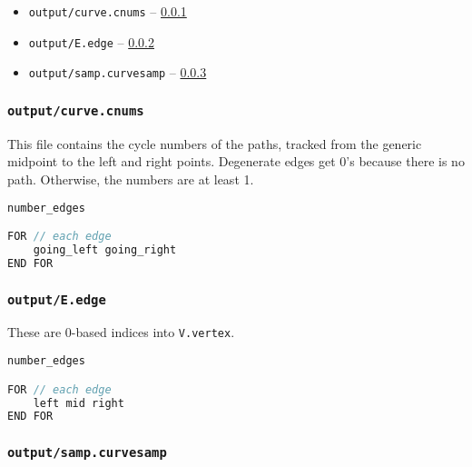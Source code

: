 \begin{itemize}
	\item {\tt output/curve.cnums} -- \ref{sec:curve.cnums}
	\item {\tt output/E.edge} -- \ref{sec:e.edge}
	\item {\tt output/samp.curvesamp} -- \ref{sec:samp.curvesamp}
\end{itemize}


\subsubsection{\tt output/curve.cnums}
\label{sec:curve.cnums}


This file contains the cycle numbers of the paths, tracked from the generic midpoint to the left and right points.  Degenerate edges get 0's because there is no path.  Otherwise, the numbers are at least 1.

\begin{center}\begin{minipage}{0.9\linewidth}
\begin{lstlisting}[language=c++, caption={\tt output/curve.cnums}, captionpos=b]
number_edges

FOR // each edge
	going_left going_right
END FOR
\end{lstlisting}
\end{minipage}\end{center}



\subsubsection{\tt output/E.edge}
\label{sec:e.edge}

These are 0-based indices into {\tt V.vertex}.

\begin{center}\begin{minipage}{0.9\linewidth}
\begin{lstlisting}[language=c++, caption={\tt output/E.edge}, captionpos=b]
number_edges

FOR // each edge
	left mid right
END FOR
\end{lstlisting}
\end{minipage}\end{center}






\subsubsection{\tt output/samp.curvesamp}
\label{sec:samp.curvesamp}

